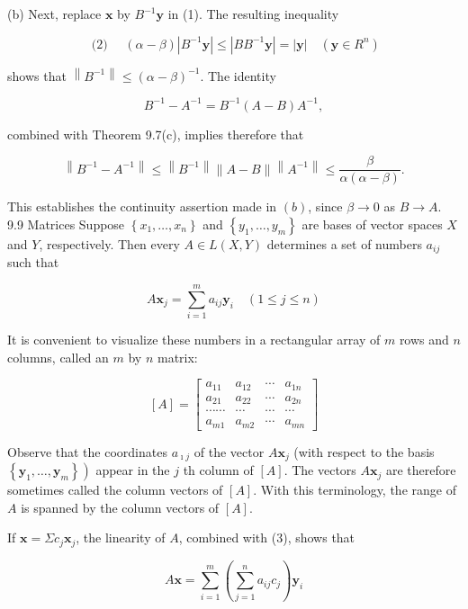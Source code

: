 \documentclass[10pt]{article}
\begin{document}
(b) Next, replace $\mathbf{x}$ by $B^{-1} \mathbf{y}$ in (1). The resulting inequality

$$
\text { (2) } \quad(\alpha-\beta)\left|B^{-1} \mathbf{y}\right| \leq\left|B B^{-1} \mathbf{y}\right|=|\mathbf{y}| \quad\left(\mathbf{y} \in R^{n}\right)
$$

shows that $\left\|B^{-1}\right\| \leq(\alpha-\beta)^{-1}$. The identity

$$
B^{-1}-A^{-1}=B^{-1}(A-B) A^{-1},
$$

combined with Theorem 9.7(c), implies therefore that

$$
\left\|B^{-1}-A^{-1}\right\| \leq\left\|B^{-1}\right\|\|A-B\|\left\|A^{-1}\right\| \leq \frac{\beta}{\alpha(\alpha-\beta)} .
$$

This establishes the continuity assertion made in $(b)$, since $\beta \rightarrow 0$ as $B \rightarrow A$. 9.9 Matrices Suppose $\left\{x_{1}, \ldots, x_{n}\right\}$ and $\left\{y_{1}, \ldots, y_{m}\right\}$ are bases of vector spaces $X$ and $Y$, respectively. Then every $A \in L(X, Y)$ determines a set of numbers $a_{i j}$ such that

$$
A \mathbf{x}_{j}=\sum_{i=1}^{m} a_{i j} \mathbf{y}_{i} \quad(1 \leq j \leq n)
$$

It is convenient to visualize these numbers in a rectangular array of $m$ rows and $n$ columns, called an $m$ by $n$ matrix:

$$
[A]=\left[\begin{array}{cccc}
a_{11} & a_{12} & \cdots & a_{1 n} \\
a_{21} & a_{22} & \cdots & a_{2 n} \\
\cdots \cdots & \cdots & \cdots & \cdots \\
a_{m 1} & a_{m 2} & \cdots & a_{m n}
\end{array}\right]
$$

Observe that the coordinates $a_{\imath j}$ of the vector $A \mathbf{x}_{j}$ (with respect to the basis $\left.\left\{\mathbf{y}_{1}, \ldots, \mathbf{y}_{m}\right\}\right)$ appear in the $j$ th column of $[A]$. The vectors $A \mathbf{x}_{j}$ are therefore sometimes called the column vectors of $[A]$. With this terminology, the range of $A$ is spanned by the column vectors of $[A]$.

If $\mathbf{x}=\Sigma c_{j} \mathbf{x}_{j}$, the linearity of $A$, combined with (3), shows that

$$
A \mathbf{x}=\sum_{i=1}^{m}\left(\sum_{j=1}^{n} a_{i j} c_{j}\right) \mathbf{y}_{i}
$$
\end{document}
